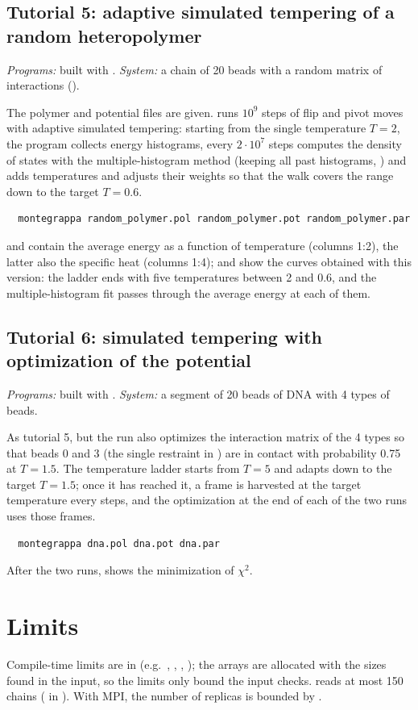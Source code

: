\documentclass[11pt,a4paper]{article}
\begin{document}
\subsection{Tutorial 5: adaptive simulated tempering of a random heteropolymer}
\emph{Programs:}  built with .
\emph{System:} a chain of 20 beads with a random matrix of interactions
().

The polymer and potential files are given.  runs
$10^9$ steps of flip and pivot moves with adaptive simulated tempering:
starting from the single temperature $T=2$, the program collects energy
histograms, every $2\cdot10^7$ steps computes the density of states with
the multiple-histogram method (keeping all past histograms,
) and adds temperatures and adjusts their weights so that
the walk covers the range down to the target $T=0.6$.
\begin{Verbatim}
  montegrappa random_polymer.pol random_polymer.pot random_polymer.par
\end{Verbatim}
 and  contain the average energy as a
function of temperature (columns 1:2), the latter also the specific heat
(columns 1:4);  and  show the curves obtained
with this version: the ladder ends with five temperatures between 2 and
0.6, and the multiple-histogram fit passes through the average energy at
each of them.

\subsection{Tutorial 6: simulated tempering with optimization of the potential}
\emph{Programs:}  built with .
\emph{System:} a segment of 20 beads of DNA with 4 types of beads.

As tutorial 5, but the run also optimizes the interaction matrix of the 4
types so that beads 0 and 3 (the single restraint in ) are in
contact with probability 0.75 at $T=1.5$. The temperature ladder starts
from $T=5$ and adapts down to the target $T=1.5$; once it has reached it,
a frame is harvested at the target temperature every 
steps, and the optimization at the end of each of the two runs uses those
frames.
\begin{Verbatim}
  montegrappa dna.pol dna.pot dna.par
\end{Verbatim}
After the two runs,  shows the minimization of $\chi^2$.

\section{Limits}
Compile-time limits are in  (e.g.\ ,
, , ); the arrays are allocated with
the sizes found in the input, so the limits only bound the input checks.
 reads at most 150 chains ( in
). With MPI, the number of replicas is bounded by
.
\end{document}
